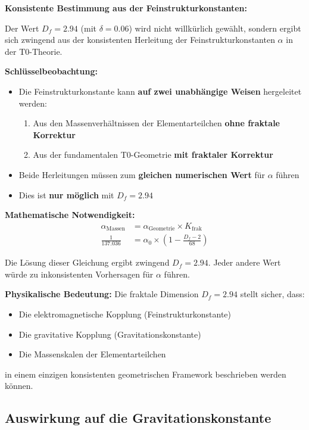 \documentclass[12pt,a4paper]{article}
\begin{document}
	\begin{derivation}
		\textbf{Konsistente Bestimmung aus der Feinstrukturkonstanten:}
		
		Der Wert $D_f = 2.94$ (mit $\delta = 0.06$) wird nicht willkürlich gewählt, sondern ergibt sich zwingend aus der konsistenten Herleitung der Feinstrukturkonstanten $\alpha$ in der T0-Theorie.
		
		\textbf{Schlüsselbeobachtung:}
		\begin{itemize}
			\item Die Feinstrukturkonstante kann \textbf{auf zwei unabhängige Weisen} hergeleitet werden:
			\begin{enumerate}
				\item Aus den Massenverhältnissen der Elementarteilchen \textbf{ohne fraktale Korrektur}
				\item Aus der fundamentalen T0-Geometrie \textbf{mit fraktaler Korrektur}
			\end{enumerate}
			\item Beide Herleitungen müssen zum \textbf{gleichen numerischen Wert} für $\alpha$ führen
			\item Dies ist \textbf{nur möglich} mit $D_f = 2.94$
		\end{itemize}
		
		\textbf{Mathematische Notwendigkeit:}
		\begin{align}
			\alpha_{\text{Massen}} &= \alpha_{\text{Geometrie}} \times K_{\text{frak}} \\
			\frac{1}{137.036} &= \alpha_0 \times \left(1 - \frac{D_f - 2}{68}\right)
		\end{align}
		
		Die Lösung dieser Gleichung ergibt zwingend $D_f = 2.94$. Jeder andere Wert würde zu inkonsistenten Vorhersagen für $\alpha$ führen.
		
		\textbf{Physikalische Bedeutung:}
		Die fraktale Dimension $D_f = 2.94$ stellt sicher, dass:
		\begin{itemize}
			\item Die elektromagnetische Kopplung (Feinstrukturkonstante)
			\item Die gravitative Kopplung (Gravitationskonstante)
			\item Die Massenskalen der Elementarteilchen
		\end{itemize}
		in einem einzigen konsistenten geometrischen Framework beschrieben werden können.
	\end{derivation}
	
	\subsection{Auswirkung auf die Gravitationskonstante}
	
\end{document}
